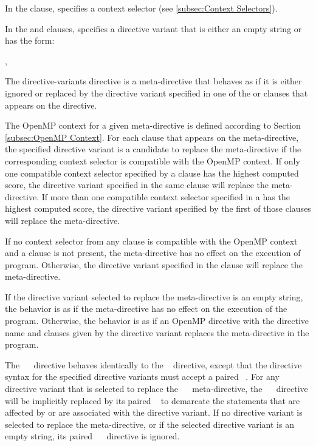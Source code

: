 In the  clause,  specifies a context
selector (see \ref{subsec:Context Selectors}).

In the  and  clauses, 
specifies a directive variant that is either an empty string or has the form:

\begin{indentedcodelist}
\plc{ directive-name [clause[ [},\plc{] clause] ... ]}
\end{indentedcodelist}

\descr

The directive-variants directive is a meta-directive that
behaves as if it is either ignored or replaced by the directive variant
specified in one of the  or  clauses that appears on
the directive.

The OpenMP context for a given meta-directive is defined according to Section
\ref{subsec:OpenMP Context}.  For each  clause that appears on the
meta-directive,  the specified directive variant is a candidate to replace the
meta-directive if the corresponding context selector is compatible with the
OpenMP context.  If only one compatible context selector specified by a
 clause has the highest computed score, the directive variant
specified in the same clause will replace the meta-directive. If more than one
compatible context selector specified in a  has the highest
computed score, the directive variant specified by the first of those 
clauses will replace the meta-directive.

If no context selector from any  clause is compatible with the
OpenMP context and a  clause is not present, the meta-directive
has no effect on the execution of program. Otherwise, the directive variant
specified in the  clause will replace the meta-directive.

If the directive variant selected to replace the meta-directive is an empty
string, the behavior is as if the meta-directive has no effect on the
execution of the program. Otherwise, the behavior is as if an OpenMP directive
with the directive name and clauses given by the directive variant replaces
the meta-directive in the program.

The ~~ directive behaves
identically to the ~ directive, except that the
directive syntax for the specified directive variants must accept a paired
~.  For any directive variant that is selected to
replace the ~~ meta-directive, the
~~ directive will be implicitly
replaced by its paired ~ to demarcate the statements
that are affected by or are associated with the directive variant. If no
directive variant is selected to replace the meta-directive, or if the
selected directive variant is an empty string, its paired
~~ directive is ignored.

